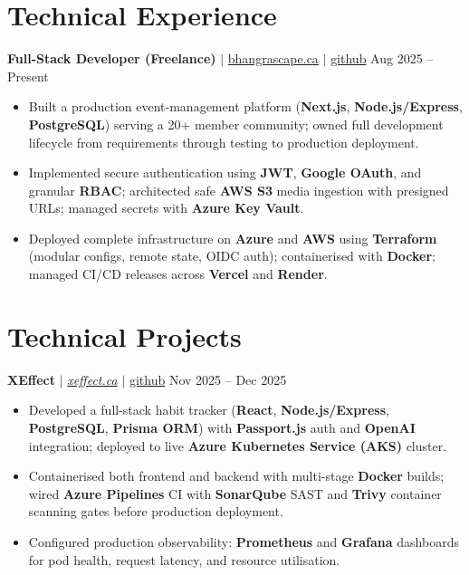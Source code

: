 \documentclass[11pt,a4paper]{article}
\begin{document}
\section{Technical Experience}

\textbf{Full-Stack Developer (Freelance)} $|$ \href{https://bhangrascape.ca}{bhangrascape.ca} $|$ \href{https://github.com/bhat0155/bhangraescape}{\small github} \hfill Aug 2025 -- Present
\begin{itemize}
    \item Built a production event-management platform (\textbf{Next.js}, \textbf{Node.js/Express}, \textbf{PostgreSQL}) serving a 20+ member community; owned full development lifecycle from requirements through testing to production deployment.
    \item Implemented secure authentication using \textbf{JWT}, \textbf{Google OAuth}, and granular \textbf{RBAC}; architected safe \textbf{AWS S3} media ingestion with presigned URLs; managed secrets with \textbf{Azure Key Vault}.
    \item Deployed complete infrastructure on \textbf{Azure} and \textbf{AWS} using \textbf{Terraform} (modular configs, remote state, OIDC auth); containerised with \textbf{Docker}; managed CI/CD releases across \textbf{Vercel} and \textbf{Render}.
\end{itemize}

\section{Technical Projects}

\textbf{XEffect} $|$ \href{https://www.xeffect.ca/app}{\emph{xeffect.ca}} $|$ \href{https://github.com/bhat0155/xeffect}{\small github} \hfill Nov 2025 -- Dec 2025
\begin{itemize}
    \item Developed a full-stack habit tracker (\textbf{React}, \textbf{Node.js/Express}, \textbf{PostgreSQL}, \textbf{Prisma ORM}) with \textbf{Passport.js} auth and \textbf{OpenAI} integration; deployed to live \textbf{Azure Kubernetes Service (AKS)} cluster.
    \item Containerised both frontend and backend with multi-stage \textbf{Docker} builds; wired \textbf{Azure Pipelines} CI with \textbf{SonarQube} SAST and \textbf{Trivy} container scanning gates before production deployment.
    \item Configured production observability: \textbf{Prometheus} and \textbf{Grafana} dashboards for pod health, request latency, and resource utilisation.
\end{itemize}
\end{document}
